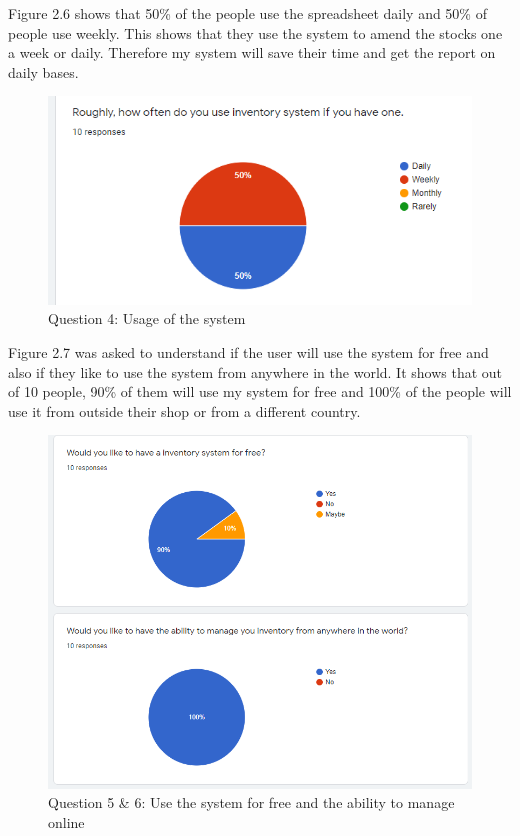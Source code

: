 Figure 2.6 shows that 50\% of the people use the spreadsheet daily and 50\% of people use weekly. This shows that they use the system to amend the stocks one a week or daily. Therefore my system will save their time and get the report on daily bases.
\begin{figure}[h]
\centering
    \includegraphics[scale=0.6]
    {images/SurveyQue4.png}
    \caption{Question 4: Usage of the system}
    \label{fig: Question 4: Usage of the system}
\end{figure}

\newpage
Figure 2.7 was asked to understand if the user will use the system for free and also if they like to use the system from anywhere in the world. It shows that out of 10 people, 90\% of them will use my system for free and 100\% of the people will use it from outside their shop or from a different country.
\begin{figure}[h]
\centering
    \includegraphics[scale=0.7]
    {images/SurveyQue5.png}
    \caption{Question 5 \& 6: Use the system for free and the ability to manage online}
    \label{fig: Question 5\& 6: Use the system for free and the ability to manage online}
\end{figure}

